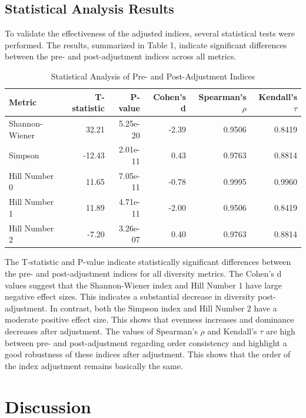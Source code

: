 \documentclass[a4paper,12pt]{article}
\begin{document}
\subsection{Statistical Analysis Results}
To validate the effectiveness of the adjusted indices, several statistical tests were performed. The results, summarized in Table 1, indicate significant differences between the pre- and post-adjustment indices across all metrics.

\begin{table}[H]
\centering
\caption{Statistical Analysis of Pre- and Post-Adjustment Indices}
\begin{tabular}{lrrrrr}
\hline
\textbf{Metric} & \textbf{T-statistic} & \textbf{P-value} & \textbf{Cohen's d} & \textbf{Spearman's $\rho$} & \textbf{Kendall's $\tau$} \\
\hline
Shannon-Wiener & 32.21 & 5.25e-20 & -2.39 & 0.9506 & 0.8419 \\
Simpson        & -12.43 & 2.01e-11 & 0.43  & 0.9763 & 0.8814 \\
Hill Number 0  & 11.65 & 7.05e-11 & -0.78 & 0.9995 & 0.9960 \\
Hill Number 1  & 11.89 & 4.71e-11 & -2.00 & 0.9506 & 0.8419 \\
Hill Number 2  & -7.20 & 3.26e-07 & 0.40  & 0.9763 & 0.8814 \\
\hline
\end{tabular}
\end{table}

The T-statistic and P-value indicate statistically significant differences between the pre- and post-adjustment indices for all diversity metrics. The Cohen's d values suggest that the Shannon-Wiener index and Hill Number 1 have large negative effect sizes. This indicates a substantial decrease in diversity post-adjustment. In contrast, both the Simpson index and Hill Number 2 have a moderate positive effect size. This shows that evenness increases and dominance decreases after adjustment. The values of Spearman's $\rho$ and Kendall's $\tau$ are high between pre- and post-adjustment regarding order consistency and highlight a good robustness of these indices after adjustment. This shows that the order of the index adjustment remains basically the same.



\section{Discussion}
\end{document}
